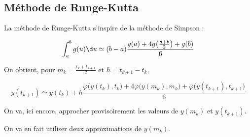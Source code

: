\subsection{Méthode de Runge-Kutta}
La méthode de Runge-Kutta s'inspire de la méthode de Simpson : 

\[ \int_{a}^b g(u) \d u\simeq (b-a)\frac{g(a)+4g\bigl(\frac{a+b}2\bigr)+g(b)}6\]

On obtient, pour $m_k = \frac{t_k+t_{k+1}}2$ et $h=t_{k+1}-t_k$,

\[ y(t_{k+1})\simeq y(t_k) + h \frac {\varphi\bigl(y(t_k),t_k\bigr)+4\varphi\bigl(y(m_k),m_k\bigr) + \varphi\bigl(y(t_{k+1}),t_{k+1}\bigr)}6 \]


On va, ici encore, approcher provisoirement les valeurs de $y(m_k)$ et $y(t_{k+1})$.

On va en fait utiliser deux approximations de $y(m_k)$.


